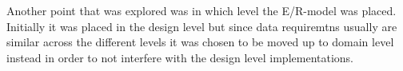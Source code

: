 Another point that was explored was in which level the E/R-model was placed. Initially it was placed in the design level but since data requiremtns usually are similar
across the different levels it was chosen to be moved up to domain level instead in order to not interfere with the design level implementations.

